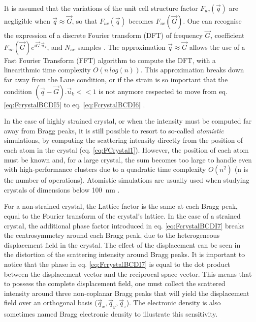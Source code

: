 It is assumed that the variations of the unit cell structure factor $F_{uc}(\vec{q})$ are negligible when $\vec{q} \approx \vec{G}$, so that $F_{uc}(\vec{q})$ becomes $F_{uc}(\vec{G})$.
One can recognise the expression of a discrete Fourier transform (DFT) of frequency $\vec{G}$, coefficient $F_{uc}(\vec{G}) e^{i\vec{G}.\vec{u}_k}$, and $N_{uc}$ samples \parencite{Cooley1965, Cochran1967, FavreNicolin2011a, Godard2021}.
The approximation $\vec{q} \approx \vec{G}$ allows the use of a Fast Fourier Transform (FFT) algorithm to compute the DFT, with a linearithmic time complexity $O(n \, log(n))$.
This approximation breaks down far away from the Laue condition, or if the strain is so important that the condition $(\vec{q}-\vec{G}).\vec{u}_k<<1$ is not anymore respected to move from eq. \ref{eq:FcrystalBCDI5} to eq. \ref{eq:FcrystalBCDI6} \parencite{Takagi1969}.

In the case of highly strained crystal, or when the intensity must be computed far away from Bragg peaks, it is still possible to resort to so-called \textit{atomistic} simulations, by computing the scattering intensity directly from the position of each atom in the crystal (eq. \ref{eq:FCrystal1}).
However, the position of each atom must be known and, for a large crystal, the sum becomes too large to handle even with high-performance clusters due to a quadratic time complexity $O(n^2)$ (n is the number of operations).
Atomistic simulations are usually used when studying crystals of dimensions below \qty{100}{\nm} \parencite{Dupraz2022}.

For a non-strained crystal, the Lattice factor is the same at each Bragg peak, equal to the Fourier transform of the crystal's lattice.
In the case of a strained crystal, the additional phase factor introduced in eq. \ref{eq:FcrystalBCDI7} breaks the centrosymmetry around each Bragg peak, due to the heterogeneous displacement field in the crystal.
The effect of the displacement can be seen in the distortion of the scattering intensity around Bragg peaks.
It is important to notice that the phase in eq. \ref{eq:FcrystalBCDI7} is equal to the dot product between the displacement vector and the reciprocal space vector.
This means that to possess the complete displacement field, one must collect the scattered intensity around three non-coplanar Bragg peaks \parencite{Newton2010} that will yield the displacement field over an orthogonal basis ($\vec{q}_x, \vec{q}_y, \vec{q}_z$).
The electronic density is also sometimes named Bragg electronic density to illustrate this sensitivity.

